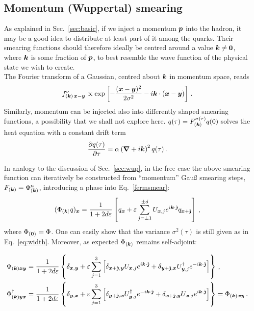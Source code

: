 \subsection{Momentum (Wuppertal) smearing}
\label{sec:newsmear}
As explained in Sec.~\ref{sec:basic},
if we inject a momentum $\boldsymbol{p}$ into the hadron, it may be
a good idea to distribute at least part of it among the quarks.
Their smearing functions should therefore ideally be centred around
a value $\boldsymbol{k}\neq\boldsymbol{0}$, where $\boldsymbol{k}$ is
some fraction of $\boldsymbol{p}$, to best resemble the
wave function of the physical state we wish to create.\\

The Fourier transform of a Gaussian,
centred about $\boldsymbol{k}$  in momentum space, reads
\begin{equation}
f^{\sigma}_{(\boldsymbol{k})\,\boldsymbol{x}-\boldsymbol{y}}\propto
\exp\left[-\frac{(\boldsymbol{x}-\boldsymbol{y})^2}{2\sigma^2}-i\boldsymbol{k}\cdot(\boldsymbol{x}-\boldsymbol{y})\right]\,.\label{eq:momsf}
\end{equation}
Similarly, momentum can be injected also into differently
shaped smearing functions, a possibility that we shall not explore
here.  $q(\tau)=F_{(\boldsymbol{k})}^{\sigma(\tau)}q(0)$
solves the heat equation with a constant drift term
\begin{equation}
\label{eq:drift}
\frac{\partial q(\tau)}{\partial\tau}=
\alpha\left(\boldsymbol{\nabla}+i\boldsymbol{k}\right)^2 q(\tau)\,.
\end{equation}

In analogy to the discussion of Sec.~\ref{sec:wup},
in the free case the above smearing function can iteratively be constructed
from ``momentum'' Gau\ss{} smearing steps,
$F_{(\boldsymbol{k})} =\Phi_{(\boldsymbol{k})}^n$, introducing a phase 
into Eq.~\eqref{fermsmear}:
\begin{equation}
(\Phi_{(\boldsymbol{k})} q)_{\boldsymbol{x}} = \frac{1}{1+2d\varepsilon} \left[q_{\boldsymbol{x}}+\varepsilon \sum_{j=\pm 1}^{\pm d} U_{\boldsymbol{x},j}e^{i\boldsymbol{k}\cdot\hat{\boldsymbol{\jmath}}} q_{\boldsymbol{x}+\hat{\boldsymbol{\jmath}}}\right]\,, \label{fermsmear2}
\end{equation}
where $\Phi_{(\boldsymbol{0})}=\Phi$.
One can easily show that the variance $\sigma^2(\tau)$ is still given
as in Eq.~\eqref{eq:width}. Moreover, as expected
$\Phi_{(\boldsymbol{k})}$ remains self-adjoint:


\begin{align}
\Phi_{(\boldsymbol{k})\boldsymbol{x}\boldsymbol{y}}&=\frac{1}{1+2d\varepsilon}\left\{\delta_{\boldsymbol{x},\boldsymbol{y}}+
\varepsilon \sum_{j=1}^{3} \left[\delta_{\boldsymbol{x}+\hat{\boldsymbol{\jmath}},\boldsymbol{y}}
U_{\boldsymbol{x},j} e^{i\boldsymbol{k}\cdot\hat{\boldsymbol{\jmath}}}
+\delta_{\boldsymbol{y}+\hat{\boldsymbol{\jmath}},\boldsymbol{x}}U^{\dagger}_{\boldsymbol{y},j} e^{-i\boldsymbol{k}\cdot\hat{\boldsymbol{\jmath}}}
\right]\right\}\,,\nonumber\\
\Phi_{(\boldsymbol{k})\boldsymbol{y}\boldsymbol{x}}^{\dagger}
&=
\frac{1}{1+2d\varepsilon}\left\{\delta_{\boldsymbol{y},\boldsymbol{x}}+
\varepsilon \sum_{j= 1}^{3} \left[\delta_{\boldsymbol{y}+\hat{\boldsymbol{\jmath}},\boldsymbol{x}}
U_{\boldsymbol{y},j}^{\dagger} e^{-i\boldsymbol{k}\cdot\hat{\boldsymbol{\jmath}}}
+\delta_{\boldsymbol{x}+\hat{\boldsymbol{\jmath}},\boldsymbol{y}}U_{\boldsymbol{x},j} e^{i\boldsymbol{k}\cdot\hat{\boldsymbol{\jmath}}}
\right]\right\}
=\Phi_{(\boldsymbol{k})\boldsymbol{x}\boldsymbol{y}}\,.\label{eq:transpose}
\end{align}


